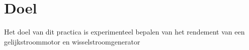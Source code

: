 \section{Doel}
Het doel van dit practica is experimenteel bepalen van het rendement
van een gelijkstroommotor en wisselstroomgenerator